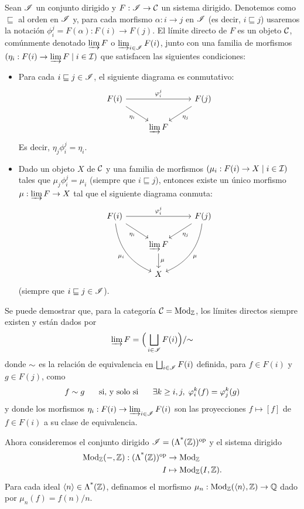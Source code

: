 Sean $\scr I$ un conjunto dirigido
y $F:\scr I\to\cal C$ un sistema dirigido.
Denotemos como $\sqsubseteq$ al orden en $\scr I$ y,
para cada morfismo $\alpha:i\to j$ en $\scr I$
(es decir, $i\sqsubseteq j$) usaremos la notación
$\phi_i^j=F(\alpha):F(i)\to F(j)$.
El límite directo de $F$ es un objeto $\cal C$,
comúnmente denotado $\varinjlim F$ o $\varinjlim_{i\in\scr I}F(i)$,
junto con una familia de morfismos
$(\eta_i:F(i)\to\varinjlim F \mid i\in\cal I)$
que satisfacen las siguientes condiciones:
\begin{itemize}
    \item Para cada $i\sqsubseteq j\in\scr I$,
    el siguiente diagrama es conmutativo:
    \[
        \begin{tikzcd}
            F(i) \ar[rr,"\phi_i^j"] \ar[dr,"\eta_i"']
            && F(j) \ar[dl,"\eta_j"] \\
                & \varinjlim F
        \end{tikzcd}
    \]
    Es decir, $\eta_j\phi_i^j=\eta_i$.
    \item Dado un objeto $X$ de $\cal C$
    y una familia de morfismos $(\mu_i:F(i)\to X\mid i\in\cal I)$
    tales que $\mu_j\phi_i^j=\mu_i$ (siempre que $i\sqsubseteq j$),
    entonces existe un único morfismo $\mu:\varinjlim F\to X$
    tal que el siguiente diagrama conmuta:
    \[
        \begin{tikzcd}
            F(i) \ar[rr,"\phi_i^j"] \ar[dr,"\eta_i"']
            \ar[ddr,"\mu_i"',bend right] 
            && F(j) \ar[dl,"\eta_j"] \ar[ddl,"\mu",bend left] \\
                & \varinjlim F \ar[d,"\mu"] \\
                & X
        \end{tikzcd}
    \]
    (siempre que $i\sqsubseteq j\in\scr I$).
\end{itemize}

Se puede demostrar que, para la categoría $\cal C=\Mod_\Z$,
los límites directos siempre existen
y están dados por
\[
    \varinjlim F = \Big(\bigsqcup_{i\in\scr I}F(i)\Big)/\simr
\]
donde $\simr$ es la relación de equivalencia en
$\bigsqcup_{i\in\scr I}F(i)$ definida, para $f\in F(i)$ y $g\in F(j)$,
como
\[
    f\sim g
    \ssi
    \exists k\geq i,j,\; \phi_i^k(f)=\phi_j^k(g)
\]
y donde los morfismos $\eta_i:F(i)\to\varinjlim_{i\in\scr I}F(i)$
son las proyecciones $f\mapsto [f]$ de $f\in F(i)$ a su clase
de equivalencia.

Ahora consideremos el conjunto dirigido $\scr I=(\nti\Z)^\op$
y el sistema dirigido
\begin{align*}
    \Mod_\Z(-,\Z):(\nti\Z)^\op&\to\Mod_\Z \\
    I&\mapsto \Mod_\Z(I,\Z).
\end{align*}
Para cada ideal $\<n\>\in\nti\Z$, definamos el morfismo
$\mu_n:\Mod_\Z(\<n\>,\Z)\to\Q$ dado por $\mu_n(f)=f(n)/n$.

